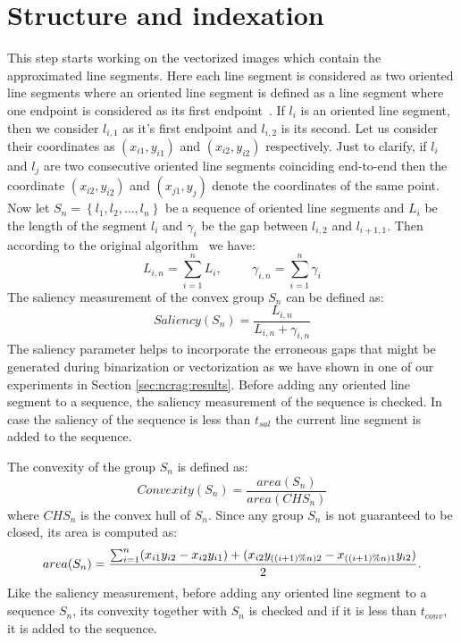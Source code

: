 \section{Structure and indexation}
\label{ssec:ncrag:ncrag}
This step starts working on the vectorized images which contain the approximated line segments. Here each line segment is considered as two oriented line segments where an oriented line segment is defined as a line segment where one endpoint is considered as its first endpoint~\cite{Jacobs1996}. If $l_i$ is an oriented line segment, then we consider $l_{i,1}$ as it's first endpoint and $l_{i,2}$ is its second. Let us consider their coordinates as $(x_{i1},y_{i1})$ and $(x_{i2},y_{i2})$ respectively. Just to clarify, if $l_i$ and $l_j$ are two consecutive oriented line segments coinciding end-to-end then the coordinate $(x_{i2},y_{i2})$ and $(x_{j1},y_{j})$ denote the coordinates of the same point. Now let $S_n = \left\{l_1,l_2,\ldots,l_n\right\}$ be a sequence of oriented line segments and $L_i$ be the length of the segment $l_i$ and $\gamma_i$ be the gap between $l_{i,2}$ and $l_{i+1,1}$. Then according to the original algorithm~\cite{Jacobs1996} we have:
\begin{equation}
L_{i,n}=\sum^n_{i=1}L_i,\hspace{1cm}\gamma_{i,n}=\sum^n_{i=1}\gamma_i
\label{eqn:ncrag:length-gap}
\end{equation}
The saliency measurement of the convex group $S_n$ can be defined as:
\begin{equation}
Saliency(S_n)=\frac{L_{i,n}}{L_{i,n}+\gamma_{i,n}}
\label{eqn:ncrag:saliency}
\end{equation}
The saliency parameter helps to incorporate the erroneous gaps that might be generated during binarization or vectorization as we have shown in one of our experiments in Section \ref{sec:ncrag:results}. Before adding any oriented line segment to a sequence, the saliency measurement of the sequence is checked. In case the saliency of the sequence is less than $t_{sal}$ the current line segment is added to the sequence.

The convexity of the group $S_n$ is defined as:
\begin{equation}
Convexity(S_n)=\frac{area(S_n)}{area(CHS_n)}
\label{eqn:ncrag:convexity}
\end{equation}
where $CHS_n$ is the convex hull of $S_n$. Since any group $S_n$ is not guaranteed to be closed, its area is computed as:
\begin{equation}
\footnotesize{
area(S_n)=\frac{\sum_{i=1}^n(x_{i1}y_{i2}-x_{i2}y_{i1}) + (x_{i2}y_{((i+1)\%n)2}-x_{((i+1)\%n)1}y_{i2})}{2}.
}
\label{eqn:ncrag:area}
\end{equation}
Like the saliency measurement, before adding any oriented line segment to a sequence $S_n$, its convexity together with $S_n$ is checked and if it is less than $t_{conv}$, it is added to the sequence.

